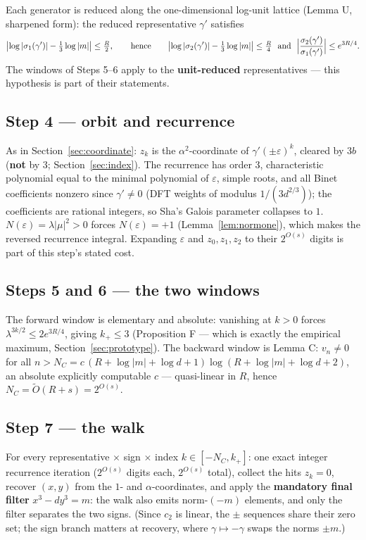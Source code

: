 \documentclass[11pt]{amsart}
\theoremstyle{plain}
\theoremstyle{remark}
\begin{document}
Each generator is reduced along the one-dimensional log-unit lattice
(Lemma U, sharpened form): the reduced representative
$\gamma'$ satisfies
\[
\bigl|\log|\sigma_1(\gamma')| - \tfrac13\log|m|\bigr| \le \tfrac{R}{2},
\qquad\text{hence}\qquad
\bigl|\log|\sigma_2(\gamma')| - \tfrac13\log|m|\bigr| \le \tfrac{R}{4}
\ \ \text{and}\ \
\Bigl|\frac{\sigma_2(\gamma')}{\sigma_1(\gamma')}\Bigr| \le e^{3R/4}.
\]
The windows of Steps 5--6 apply to the \textbf{unit-reduced}
representatives --- this hypothesis is part of their statements.

\subsection{Step 4 --- orbit and recurrence}\label{sec:step4}

As in Section~\ref{sec:coordinate}: $z_k$ is the $\alpha^2$-coordinate
of $\gamma'(\pm\varepsilon)^k$, cleared by $3b$ (\textbf{not} by 3;
Section~\ref{sec:index}). The recurrence has order 3, characteristic
polynomial equal to the minimal polynomial of $\varepsilon$, simple
roots, and all Binet coefficients nonzero since $\gamma' \ne 0$ (DFT
weights of modulus $1/(3d^{2/3})$); the coefficients are rational
integers, so Sha's Galois parameter collapses to $1$.
$N(\varepsilon) = \lambda|\mu|^2 > 0$ forces $N(\varepsilon) = +1$
(Lemma~\ref{lem:normone}), which makes the reversed recurrence
integral. Expanding $\varepsilon$ and $z_0, z_1, z_2$ to their
$2^{O(s)}$ digits is part of this step's stated cost.

\subsection{Steps 5 and 6 --- the two windows}\label{sec:steps56}

The forward window is elementary and absolute: vanishing at $k > 0$
forces $\lambda^{3k/2} \le 2e^{3R/4}$, giving $k_+ \le 3$
(Proposition F --- which is exactly the empirical maximum,
Section~\ref{sec:prototype}). The backward window is Lemma C:
$v_n \ne 0$ for all
$n > N_C = c\,(R + \log|m| + \log d + 1)\log(R + \log|m| + \log d +
2)$, an absolute explicitly computable $c$ --- quasi-linear in $R$,
hence $N_C = \widetilde O(R + s) = 2^{O(s)}$.

\subsection{Step 7 --- the walk}\label{sec:step7}

For every representative $\times$ sign $\times$ index
$k \in [-N_C, k_+]$: one exact integer recurrence iteration
($2^{O(s)}$ digits each, $2^{O(s)}$ total), collect the hits
$z_k = 0$, recover $(x, y)$ from the $1$- and $\alpha$-coordinates,
and apply the \textbf{mandatory final filter} $x^3 - dy^3 = m$: the
walk also emits norm-$(-m)$ elements, and only the filter separates
the two signs. (Since $c_2$ is linear, the $\pm$ sequences share
their zero set; the sign branch matters at recovery, where
$\gamma \mapsto -\gamma$ swaps the norms $\pm m$.)
\end{document}
